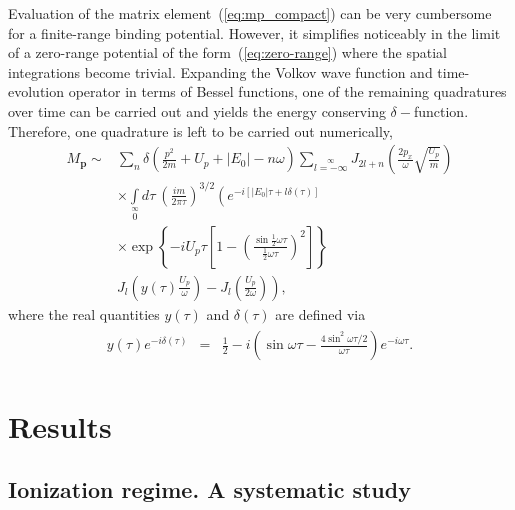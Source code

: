 Evaluation of the matrix element~(\ref{eq:mp_compact}) can be very
cumbersome for a finite-range binding potential. However, it
simplifies noticeably in the limit of a zero-range potential of the
form~(\ref{eq:zero-range}) where the spatial integrations become
trivial. Expanding the Volkov wave function and time-evolution
operator in terms of Bessel functions, one of the remaining
quadratures over time can be carried out and yields the energy
conserving $\delta-$function. Therefore, one quadrature is left to be
carried out numerically,
%
\begin{equation}
\label{eq:Mp_quad}
\begin{split}
M_{\mathbf{p}} \sim &
\sum\limits_{n} \delta\left(\frac{p^{2}}{2m} + U_{p} + |E_{0}| - n\omega\right)
\sum\limits_{l=-\infty}\limits^{\infty}
J_{2l+n}\left( \frac{2p_{x}}{\omega} \sqrt{\frac{U_{p}}{m}} \right) \\
& \times \int\limits_{0}\limits^{\infty} d\tau\ \left( \frac{im}{2\pi\tau} \right)^{3/2}
\left( e^{-i[|E_{0}|\tau + l\delta(\tau)]} \right. \\
& \times \exp\left\{-iU_{p}\tau
\left[1 - \left(\frac{\sin\frac{1}{2}\omega\tau}{\frac{1}{2}\omega\tau}\right)^{2}\right]
\right\} \\
& \left. J_{l}\left(y(\tau)\frac{U_{p}}{\omega}\right)
- J_{l}\left(\frac{U_{p}}{2\omega}\right)
\right),
\end{split}
\end{equation}
%
where the real quantities $y(\tau)$ and $\delta(\tau)$ are defined via
%
\begin{eqnarray}
\label{eq:real_quant}
\begin{split}
y(\tau) e^{-i \delta(\tau)} & = & \frac{1}{2} - i \left(
\sin\omega\tau - \frac{4 \sin^{2}\omega\tau/2}{\omega\tau} \right)
e^{-i\omega\tau}.
\end{split}
\end{eqnarray}



\section{\label{sec:results_qm} Results}
\subsection{\label{sec:kopold_qm} Ionization regime. A systematic study}

